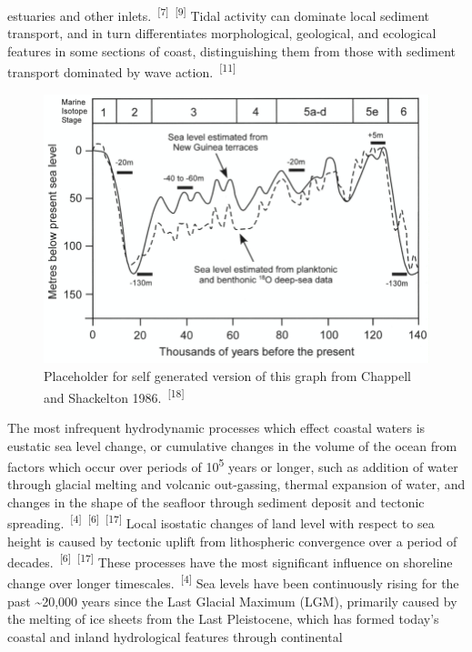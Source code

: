 \documentclass{article}
\begin{document}
\newpage
{}
\fancyfoot[C]{\thepage} 
\thispagestyle{fancy}

\par{\noindent estuaries and other inlets.~\textsuperscript{[7]}~\textsuperscript{[9]} Tidal activity can dominate local sediment transport, and in turn differentiates morphological, geological, and ecological features in some sections of coast, distinguishing them from those with sediment transport dominated by wave action.~\textsuperscript{[11]}}

\begin{figure}
    \centering
    \includegraphics[width=0.75\linewidth]{images/eustatic-sea-level-change.png}
    \caption{Placeholder for self generated version of this graph from Chappell and Shackelton 1986.~\textsuperscript{[18]}}
    \label{figure4}
\end{figure}

\par{The most infrequent hydrodynamic processes which effect coastal waters is eustatic sea level change, or cumulative changes in the volume of the ocean from factors which occur over periods of 10\textsuperscript{5} years or longer, such as addition of water through glacial melting and volcanic out-gassing, thermal expansion of water, and changes in the shape of the seafloor through sediment deposit and tectonic spreading.~\textsuperscript{[4]}~\textsuperscript{[6]}~\textsuperscript{[17]} Local isostatic changes of land level with respect to sea height is caused by tectonic uplift from lithospheric convergence over a period of decades.~\textsuperscript{[6]}~\textsuperscript{[17]} These processes have the most significant influence on shoreline change over longer timescales.~\textsuperscript{[4]} Sea levels have been continuously rising for the past \textasciitilde20,000 years since the Last Glacial Maximum (LGM), primarily caused by the melting of ice sheets from the Last Pleistocene, which has formed today's coastal and inland hydrological features through continental}
\end{document}

